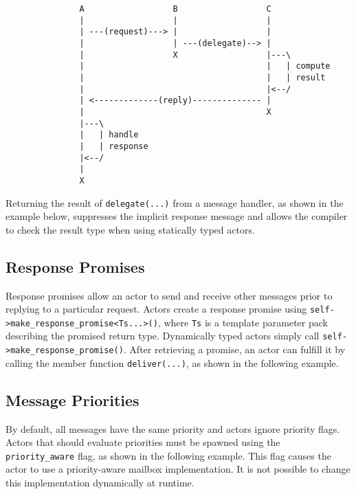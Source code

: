 \begin{footnotesize}
\begin{verbatim}
               A                  B                  C
               |                  |                  |
               | ---(request)---> |                  |
               |                  | ---(delegate)--> |
               |                  X                  |---\
               |                                     |   | compute
               |                                     |   | result
               |                                     |<--/
               | <-------------(reply)-------------- |
               |                                     X
               |---\
               |   | handle
               |   | response
               |<--/
               |
               X
\end{verbatim}
\end{footnotesize}

Returning the result of \lstinline^delegate(...)^ from a message handler, as shown in the example below, suppresses the implicit response message and allows the compiler to check the result type when using statically typed actors.



\subsection{Response Promises}
\label{promise}

Response promises allow an actor to send and receive other messages prior to replying to a particular request. Actors create a response promise using \lstinline^self->make_response_promise<Ts...>()^, where \lstinline^Ts^ is a template parameter pack describing the promised return type. Dynamically typed actors simply call \lstinline^self->make_response_promise()^. After retrieving a promise, an actor can fulfill it by calling the member function \lstinline^deliver(...)^, as shown in the following example.



\clearpage
\subsection{Message Priorities}

By default, all messages have the same priority and actors ignore priority flags.
Actors that should evaluate priorities must be spawned using the \lstinline^priority_aware^ flag, as shown in the following example.
This flag causes the actor to use a priority-aware mailbox implementation.
It is not possible to change this implementation dynamically at runtime.


